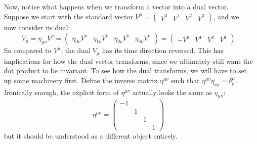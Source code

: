 Now, notice what happens when we transform a vector into a dual vector. Suppose we start with the standard
vector \( V^{\mu} = \begin{pmatrix} V^{0} & V^{1} & V^{2} & V^{3} \end{pmatrix} \), and we now consider its
dual:
\[
	V_{\mu} = \eta_{\mu \nu}V^{\nu} = \begin{pmatrix} \eta_{0 \nu}V^{\nu} & \eta_{1 \nu} V^{\nu} & \eta_{2
		\nu} V^{\nu} & \eta_{3 \nu}V^{\nu}  \end{pmatrix} = \begin{pmatrix} -V^{0} & V^{1} & V^2 & V^3 \end{pmatrix}
\]
So compared to \( V^{\mu} \), the dual \( V_{\mu} \) has its time direction reversed. This has implications
for how the dual vector transforms, since we ultimately still want the dot product to be invariant. To see
how the dual transforms, we will have to set up some machinery first. Define the inverse matrix \( \eta^{\mu
\nu} \) such that \( \eta^{\mu \nu} \eta_{\nu \rho} = \delta^{\mu}_\rho \). Ironically enough, the explicit
form of \( \eta^{\mu \nu} \) actually looks the same as \( \eta_{\mu \nu} \):
\[
	\eta^{\mu \nu} = \begin{pmatrix} -1 &  & & \\ & 1 & & \\ & & 1 & \\ && & 1 \end{pmatrix}
\]
but it should be understood as a different object entirely. 


